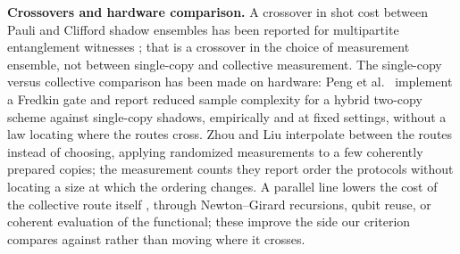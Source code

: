 %
%

\textbf{Crossovers and hardware comparison.} A crossover in shot cost
between Pauli and Clifford shadow ensembles has been reported for
multipartite entanglement witnesses \cite{paulicliffordxover2026}; that is
a crossover in the choice of measurement ensemble, not between single-copy
and collective measurement. The single-copy versus collective comparison
has been made on hardware: Peng et al.~\cite{peng2025beyond} implement a
Fredkin gate and report reduced sample complexity for a hybrid two-copy
scheme against single-copy shadows, empirically and at fixed settings,
without a law locating where the routes cross. Zhou and
Liu \cite{zhou2024hybrid} interpolate between the routes instead of
choosing, applying randomized measurements to a few coherently prepared
copies; the measurement counts they report order the protocols without
locating a size at which the ordering changes. A parallel line lowers the
cost of the collective route itself \cite{shin2025resource, shi2025moments,
yao2026sample}, through Newton--Girard recursions, qubit reuse, or coherent
evaluation of the functional; these improve the side our criterion compares
against rather than moving where it crosses.

